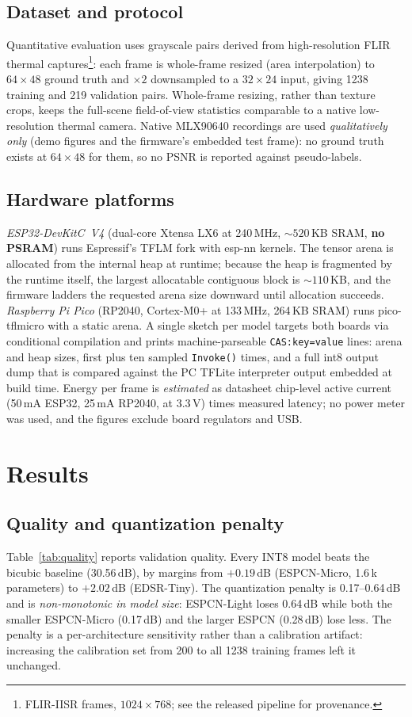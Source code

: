 \documentclass[conference,a4paper]{IEEEtran}
\begin{document}
\subsection{Dataset and protocol}
Quantitative evaluation uses grayscale pairs derived from high-resolution
FLIR thermal captures\footnote{FLIR-IISR frames, $1024{\times}768$; see the
released pipeline for provenance.}: each frame is whole-frame resized
(area interpolation) to $64{\times}48$ ground truth and $\times 2$
downsampled to a $32{\times}24$ input, giving 1238 training and 219
validation pairs. Whole-frame resizing, rather than texture crops, keeps the
full-scene field-of-view statistics comparable to a native low-resolution
thermal camera. Native MLX90640 recordings \cite{zhu2021thermal} are used
\emph{qualitatively only} (demo figures and the firmware's embedded test
frame): no ground truth exists at $64{\times}48$ for them, so no PSNR is
reported against pseudo-labels.

\subsection{Hardware platforms}
\emph{ESP32-DevKitC~V4} (dual-core Xtensa LX6 at 240\,MHz, ${\sim}520$\,KB
SRAM, \textbf{no PSRAM}) \cite{esp32ds} runs Espressif's TFLM fork with
esp-nn kernels. The tensor arena is allocated from the internal heap at
runtime; because the heap is fragmented by the runtime itself, the largest
allocatable contiguous block is ${\sim}110$\,KB, and the firmware ladders
the requested arena size downward until allocation succeeds.
\emph{Raspberry Pi Pico} (RP2040, Cortex-M0+ at 133\,MHz, 264\,KB SRAM)
\cite{rp2040ds} runs pico-tflmicro with a static arena. A single sketch per
model targets both boards via conditional compilation and prints
machine-parseable \texttt{CAS:key=value} lines: arena and heap sizes, first
plus ten sampled \texttt{Invoke()} times, and a full int8 output dump that
is compared against the PC TFLite interpreter output embedded at build
time. Energy per frame is \emph{estimated} as datasheet chip-level active
current (50\,mA ESP32, 25\,mA RP2040, at 3.3\,V) times measured latency; no
power meter was used, and the figures exclude board regulators and USB.

\section{Results}
\subsection{Quality and quantization penalty}
Table~\ref{tab:quality} reports validation quality. Every INT8 model beats
the bicubic baseline (30.56\,dB), by margins from $+0.19$\,dB (ESPCN-Micro,
1.6\,k parameters) to $+2.02$\,dB (EDSR-Tiny). The quantization penalty is
0.17--0.64\,dB and is \emph{non-monotonic in model size}: ESPCN-Light loses
0.64\,dB while both the smaller ESPCN-Micro (0.17\,dB) and the larger ESPCN
(0.28\,dB) lose less. The penalty is a per-architecture sensitivity rather
than a calibration artifact: increasing the calibration set from 200 to all
1238 training frames left it unchanged.
\end{document}
